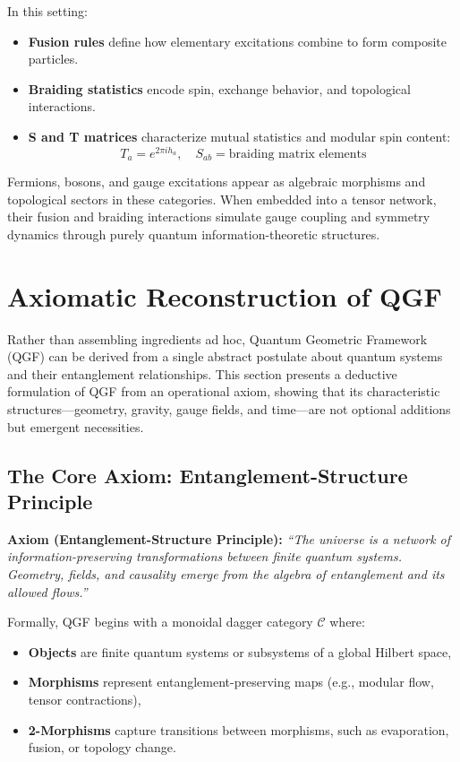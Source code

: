 \documentclass[11pt]{article}
\begin{document}
In this setting:
\begin{itemize}
    \item \textbf{Fusion rules} define how elementary excitations combine to form composite particles.
    \item \textbf{Braiding statistics} encode spin, exchange behavior, and topological interactions.
    \item \textbf{S and T matrices} characterize mutual statistics and modular spin content:
    \begin{equation}
    T_a = e^{2\pi i h_a}, \quad S_{ab} = \text{braiding matrix elements}
    \end{equation}
\end{itemize}

Fermions, bosons, and gauge excitations appear as algebraic morphisms and topological sectors in these categories. When embedded into a tensor network, their fusion and braiding interactions simulate gauge coupling and symmetry dynamics through purely quantum information-theoretic structures.


\section{Axiomatic Reconstruction of QGF} \label{sec:axiomatic}

Rather than assembling ingredients ad hoc, Quantum Geometric Framework (QGF) can be derived from a single abstract postulate about quantum systems and their entanglement relationships. This section presents a deductive formulation of QGF from an operational axiom, showing that its characteristic structures—geometry, gravity, gauge fields, and time—are not optional additions but emergent necessities.

\subsection{The Core Axiom: Entanglement-Structure Principle}

\textbf{Axiom (Entanglement-Structure Principle):}  
\textit{“The universe is a network of information-preserving transformations between finite quantum systems. Geometry, fields, and causality emerge from the algebra of entanglement and its allowed flows.”}

Formally, QGF begins with a monoidal dagger category $\mathcal{C}$ where:
\begin{itemize}
    \item \textbf{Objects} are finite quantum systems or subsystems of a global Hilbert space,
    \item \textbf{Morphisms} represent entanglement-preserving maps (e.g., modular flow, tensor contractions),
    \item \textbf{2-Morphisms} capture transitions between morphisms, such as evaporation, fusion, or topology change.
\end{itemize}
\end{document}
